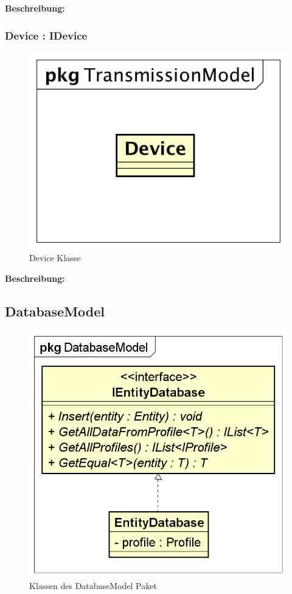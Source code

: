 \documentclass[a4paper]{scrreprt}
\begin{document}
\textbf{Beschreibung:} 


\subsubsection{Device : IDevice}
\begin{figure}[H]
\centering
\includegraphics[width=0.45\textheight]{graphics/Klassendiagramme/Model/Device.png}
\caption{Device Klasse}
\end{figure}

\textbf{Beschreibung:} 


\subsection{DatabaseModel}
\begin{figure}[H]
\centering
\includegraphics[width=0.55\textheight]{graphics/Klassendiagramme/Model/DatabaseModelPackage.png}
\caption{Klassen des DatabaseModel Paket}
\end{figure}
\end{document}
